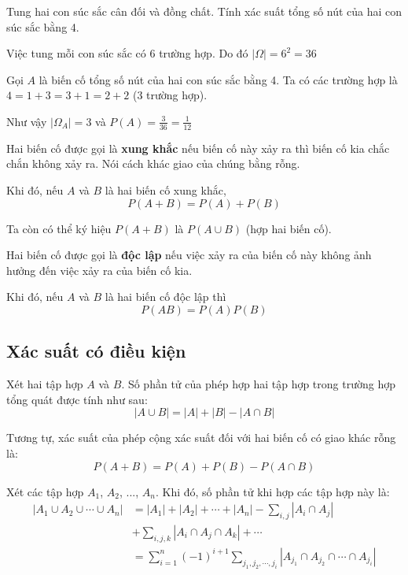 \begin{example}
    Tung hai con súc sắc cân đối và đồng chất. Tính xác suất tổng số nút của hai con súc sắc bằng 4.
    
    Việc tung mỗi con súc sắc có 6 trường hợp. Do đó $|\Omega| = 6^2 = 36$
    
    Gọi $A$ là biến cố tổng số nút của hai con súc sắc bằng 4. Ta có các trường hợp là $4=1+3=3+1=2+2$ (3 trường hợp).
    
    Như vậy $|\Omega_A| = 3$ và $P(A) = \frac{3}{36} = \frac{1}{12}$
\end{example}

\begin{definition}
    Hai biến cố được gọi là \textbf{xung khắc} nếu biến cố này xảy ra thì biến cố kia chắc chắn không xảy ra. Nói cách khác giao của chúng bằng rỗng.
\end{definition}
    
Khi đó, nếu $A$ và $B$ là hai biến cố xung khắc, \[P(A + B) = P(A) + P(B)\]
    
Ta còn có thể ký hiệu $P(A+B)$ là $P(A \cup B)$ (hợp hai biến cố).
    
\begin{definition}
    Hai biến cố được gọi là \textbf{độc lập} nếu việc xảy ra của biến cố này không ảnh hưởng đến việc xảy ra của biến cố kia. 
\end{definition}

Khi đó, nếu $A$ và $B$ là hai biến cố độc lập thì \[P(AB) = P(A)P(B)\]    

\subsection*{Xác suất có điều kiện}

Xét hai tập hợp $A$ và $B$. Số phần tử của phép hợp hai tập hợp trong trường hợp tổng quát được tính như sau: \[|A \cup B| = |A| + |B| - |A \cap B|\]
    
Tương tự, xác suất của phép cộng xác suất đối với hai biến cố có giao khác rỗng là: \[P(A + B) = P(A) + P(B) - P(A \cap B)\]

Xét các tập hợp $A_1$, $A_2$, ..., $A_n$. Khi đó, số phần tử khi hợp các tập hợp này là:
\begin{equation*}
    \begin{split}
        |A_1 \cup A_2 \cup \cdots \cup A_n| & = |A_1| + |A_2| + \cdots + |A_n| - \sum_{i, j}|A_i \cap A_j| \\ & + \sum_{i, j, k} |A_i \cap A_j \cap A_k| + \cdots \\ & = \sum_{i=1}^n (-1)^{i+1} \sum_{j_1, j_2, \cdots, j_i} |A_{j_1} \cap A_{j_2} \cap \cdots \cap A_{j_i} |
    \end{split}
\end{equation*}

